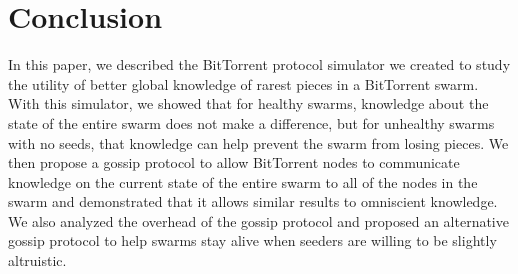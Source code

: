 \section{Conclusion}

In this paper, we described the BitTorrent protocol simulator we created
to study the utility of better global knowledge of rarest pieces in a
BitTorrent swarm. With this simulator, we showed that for healthy swarms,
knowledge about the state of the entire swarm  does not make a difference,
but for unhealthy swarms
with no seeds, that knowledge can help prevent the swarm from losing
pieces.  We then propose a gossip protocol to allow BitTorrent nodes to
communicate knowledge on the current state of the entire swarm to all of the 
nodes in the swarm and demonstrated
that it allows similar results to omniscient knowledge. We also
analyzed the overhead of the gossip protocol and proposed an alternative
gossip protocol to help swarms stay alive when seeders are willing to
be slightly altruistic.
